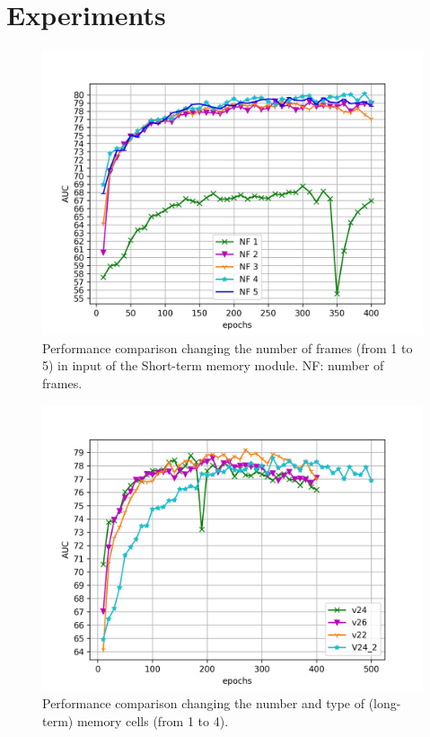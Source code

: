 \section{Experiments}
\label{sec:experiments}

\begin{figure}[t]
\centering
	\includegraphics[trim=0 0 0 0, clip, width=1.\linewidth]{images/exp_1.jpg}
	\caption{Performance comparison changing the number of frames (from 1 to 5) in input of the Short-term memory module. NF: number of frames.}
	\label{fig:num-frames-vst}
\end{figure}

\begin{figure}[t]
\centering
	\includegraphics[trim=0 0 0 0, clip, width=1.\linewidth]{images/exp_2.jpg}
	\caption{Performance comparison changing the number and type of (long-term) memory cells (from 1 to 4).}
	\label{fig:num-memory-cells}
\end{figure}

